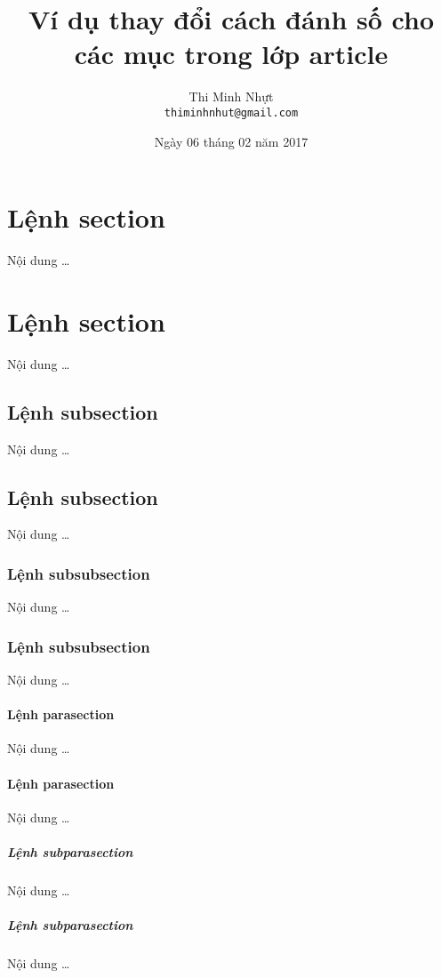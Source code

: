 \documentclass[12pt,a4paper]{article}
\title{\bfseries \huge Ví dụ thay đổi cách đánh số cho các mục trong lớp article}
\author{\Large Thi Minh Nhựt \bigskip \\  \Large \texttt{thiminhnhut@gmail.com}}
\date{\Large Ngày 06 tháng 02 năm 2017}
\newcommand{\parasection}[1]{\paragraph{#1}\mbox{}\medskip\par}
\newcommand{\subparasection}[1]{{\setlength{\parindent}{0pt}\subparagraph{#1}\mbox{}\medskip \par}}
\begin{document}
\maketitle
\tableofcontents
\thispagestyle{empty}
\newpage

\section{Lệnh section}
Nội dung \ldots
\section{Lệnh section}
Nội dung \ldots

\subsection{Lệnh subsection}
Nội dung \ldots
\subsection{Lệnh subsection}
Nội dung \ldots

\subsubsection{Lệnh subsubsection}
Nội dung \ldots
\subsubsection{Lệnh subsubsection}
Nội dung \ldots

\parasection{Lệnh parasection}
Nội dung \ldots
\parasection{Lệnh parasection}
Nội dung \ldots

\subparasection{Lệnh subparasection}
Nội dung \ldots
\subparasection{Lệnh subparasection}
Nội dung \ldots
\end{document}
